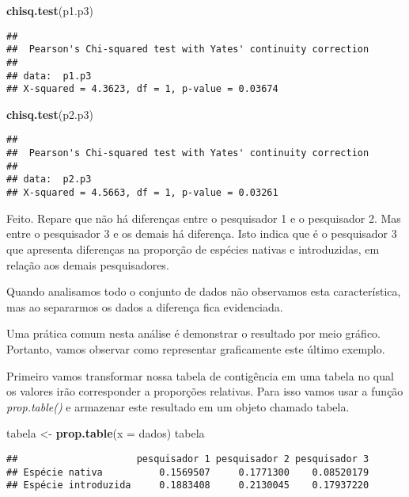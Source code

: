 \documentclass[titlepage, oneside, openany, a4paper]{book}
\newenvironment{Shaded}{\begin{snugshade}}{\end{snugshade}}
\newcommand{\DataTypeTok}[1]{\textcolor[rgb]{0.13,0.29,0.53}{#1}}
\newcommand{\KeywordTok}[1]{\textcolor[rgb]{0.13,0.29,0.53}{\textbf{#1}}}
\newcommand{\NormalTok}[1]{#1}
\newcommand{\StringTok}[1]{\textcolor[rgb]{0.31,0.60,0.02}{#1}}
\begin{document}
\begin{Shaded}
\begin{Highlighting}[]
\KeywordTok{chisq.test}\NormalTok{(p1.p3)}
\end{Highlighting}
\end{Shaded}

\begin{verbatim}
## 
##  Pearson's Chi-squared test with Yates' continuity correction
## 
## data:  p1.p3
## X-squared = 4.3623, df = 1, p-value = 0.03674
\end{verbatim}

\begin{Shaded}
\begin{Highlighting}[]
\KeywordTok{chisq.test}\NormalTok{(p2.p3)}
\end{Highlighting}
\end{Shaded}

\begin{verbatim}
## 
##  Pearson's Chi-squared test with Yates' continuity correction
## 
## data:  p2.p3
## X-squared = 4.5663, df = 1, p-value = 0.03261
\end{verbatim}

Feito. Repare que não há diferenças entre o pesquisador 1 e o pesquisador 2. Mas entre o pesquisador 3 e os demais há diferença. Isto indica que é o pesquisador 3 que apresenta diferenças na proporção de espécies nativas e introduzidas, em relação aos demais pesquisadores.

Quando analisamos todo o conjunto de dados não observamos esta característica, mas ao separarmos os dados a diferença fica evidenciada.

Uma prática comum nesta análise é demonstrar o resultado por meio gráfico. Portanto, vamos observar como representar graficamente este último exemplo.

Primeiro vamos transformar nossa tabela de contigência em uma tabela no qual os valores irão corresponder a proporções relativas. Para isso vamos usar a função \emph{prop.table()} e armazenar este resultado em um objeto chamado tabela.

\begin{Shaded}
\begin{Highlighting}[]
\NormalTok{tabela <-}\StringTok{ }\KeywordTok{prop.table}\NormalTok{(}\DataTypeTok{x =}\NormalTok{ dados)}
\NormalTok{tabela}
\end{Highlighting}
\end{Shaded}

\begin{verbatim}
##                     pesquisador 1 pesquisador 2 pesquisador 3
## Espécie nativa          0.1569507     0.1771300    0.08520179
## Espécie introduzida     0.1883408     0.2130045    0.17937220
\end{verbatim}
\end{document}
